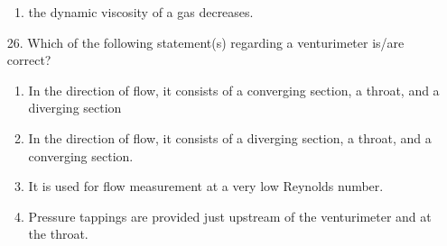 \documentclass[journal]{IEEEtran}
\begin{document}
\begin{enumerate}
\begin{enumerate}[label = (\Alph*)]
        \item the dynamic viscosity of a gas decreases. 
    \end{enumerate}
    \item[26.] Which of the following statement(s) regarding a venturimeter is/are correct? 
    \begin{enumerate}[label = (\Alph*)]
        \item In the direction of flow, it consists of a converging section, a throat, and a
        diverging section
        \item In the direction of flow, it consists of a diverging section, a throat, and a
        converging section.
        \item It is used for flow measurement at a very low Reynolds number.
        \item Pressure tappings are provided just upstream of the venturimeter and at the throat.
    \end{enumerate}
\end{enumerate}
\end{document}

